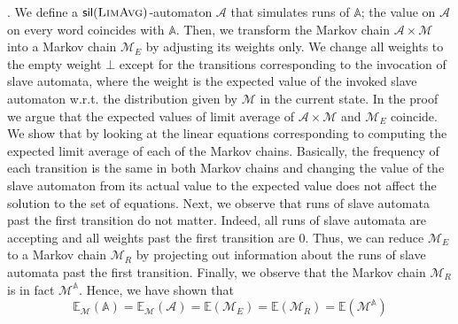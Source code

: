 \documentclass{lmcs}
\newcommand{\Paragraph}[1]{\noindent{\textbf{#1}}}
\newcommand{\nestedA}{\mathbb{A}}
\newcommand{\nonnestedA}{\mathcal{A}}
\newcommand{\silent}[1]{\mathsf{sil}({#1})}
\newcommand{\MCfromNested}{\markov^{\nestedA}}
\newcommand{\flimavg}{\textsc{LimAvg}}
\newcommand{\expected}{\mathbb{E}}
\newcommand{\markov}{\mathcal{M}}
\begin{document}
\smallskip
\Paragraph{The plan of the proof}.
We define a $\silent{\flimavg}$-automaton $\nonnestedA$ that simulates runs of
$\nestedA$; the value on $\nonnestedA$ on every word coincides with $\nestedA$.
Then, we transform the Markov chain $\nonnestedA \times \markov$ into
 a Markov chain $\markov_E$ by adjusting its weights only.
We change all weights to the empty weight $\bot$ except for the transitions
corresponding to the invocation of slave automata, where the weight is the expected value of the invoked slave automaton w.r.t.
the distribution given by $\markov$ in the current state.
In the proof we argue that the expected values of limit average of $\nonnestedA \times \markov$ and $\markov_E$ coincide.
We show that by looking at the linear equations corresponding to computing the expected limit average of each of the Markov chains.
Basically, the frequency of each transition is the same in both Markov chains and changing the value of the slave automaton
from its actual value to the expected value does not affect the solution to the set of equations.
Next, we observe that runs of slave automata past the first transition do not matter. Indeed, all runs of slave automata are accepting and all weights past
the first transition are $0$. Thus, we can reduce $\markov_E$ to a Markov chain $\markov_R$ by projecting out information about the runs of  slave automata past the first transition.
Finally, we observe that the Markov chain $\markov_R$ is in fact $\MCfromNested$. Hence, we have shown that
\[
\expected_{\markov}(\nestedA) = \expected_{\markov}(\nonnestedA) = \expected (\markov_E) = \expected(\markov_R) = \expected(\MCfromNested)
\]
\smallskip
\end{document}
